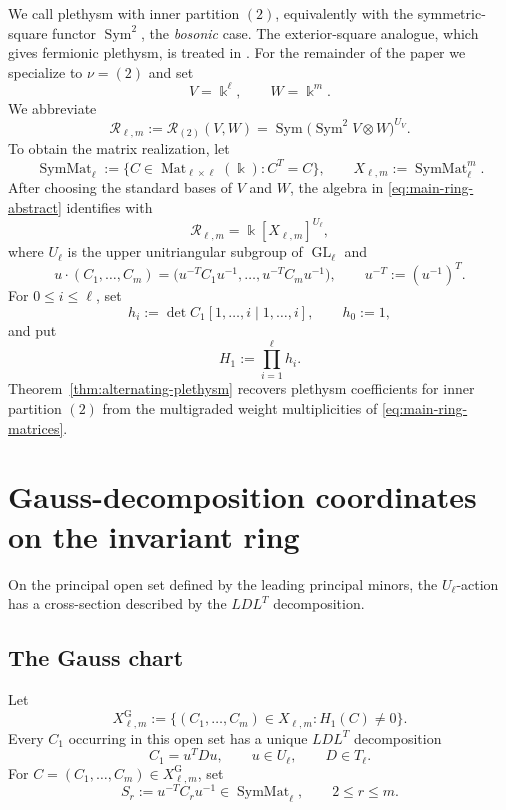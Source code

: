 \documentclass[11pt]{amsart}
\theoremstyle{definition}
\theoremstyle{remark}
\newcommand{\kk}{\Bbbk}
\newcommand{\GL}{\operatorname{GL}}
\newcommand{\Sym}{\operatorname{Sym}}
\newcommand{\SymMat}{\operatorname{SymMat}}
\newcommand{\cR}{\mathcal R}
\begin{document}
We call plethysm with inner partition $(2)$, equivalently with the symmetric-square
functor $\Sym^2$, the \emph{bosonic} case.  The exterior-square analogue,
which gives fermionic plethysm, is treated in \cite{FFP}.  For the remainder
of the paper we specialize to $\nu=(2)$ and set
\[ V=\kk^\ell, \qquad W=\kk^m. \]
We abbreviate
\begin{equation}
 \cR_{\ell,m}
 :=\cR_{(2)}(V,W)
 =\Sym\bigl(\Sym^2V\otimes W\bigr)^{U_V}.
 \label{eq:main-ring-abstract}
\end{equation}
To obtain the matrix realization, let
\[ \SymMat_\ell :=\{C\in\operatorname{Mat}_{\ell\times\ell}(\kk):C^T=C\}, \qquad X_{\ell,m}:=\SymMat_\ell^m. \]
After choosing the standard bases of $V$ and $W$, the algebra in
\eqref{eq:main-ring-abstract} identifies with
\begin{equation}
 \cR_{\ell,m}=\kk[X_{\ell,m}]^{U_\ell},
 \label{eq:main-ring-matrices}
\end{equation}
where $U_\ell$ is the upper unitriangular subgroup of $\GL_\ell$ and
\[ u\cdot(C_1,\ldots,C_m) = \bigl(u^{-T}C_1u^{-1},\ldots,u^{-T}C_mu^{-1}\bigr), \qquad u^{-T}:=(u^{-1})^T. \]
For $0\le i\le\ell$, set
\begin{equation}
 h_i:=\det C_1[1,\ldots,i\mid1,\ldots,i],
 \qquad h_0:=1,
 \label{eq:hi-definition}
\end{equation}
and put
\[ H_1:=\prod_{i=1}^{\ell}h_i. \]
Theorem~\ref{thm:alternating-plethysm} recovers plethysm coefficients for
inner partition $(2)$ from the multigraded weight multiplicities of
\eqref{eq:main-ring-matrices}.





\section{Gauss-decomposition coordinates on the invariant ring}
\label{sec:gaussian-localization}

On the principal open set defined by the leading principal minors, the
$U_\ell$-action has a cross-section described by the $LDL^T$ decomposition.

\subsection{The Gauss chart}
\label{subsec:gaussian-slice}

Let
\[ X_{\ell,m}^{\mathrm G} :=\{(C_1,\ldots,C_m)\in X_{\ell,m}:H_1(C)\ne0\}. \]
Every $C_1$ occurring in this open set has a unique $LDL^T$
decomposition
\begin{equation}
 C_1=u^TDu,
 \qquad u\in U_\ell,
 \qquad D\in T_\ell.
 \label{eq:symmetric-gaussian-decomposition}
\end{equation}
For $C=(C_1,\ldots,C_m)\in X_{\ell,m}^{\mathrm G}$, set
\[ S_r:=u^{-T}C_ru^{-1}\in\SymMat_\ell, \qquad 2\le r\le m. \]
\end{document}
